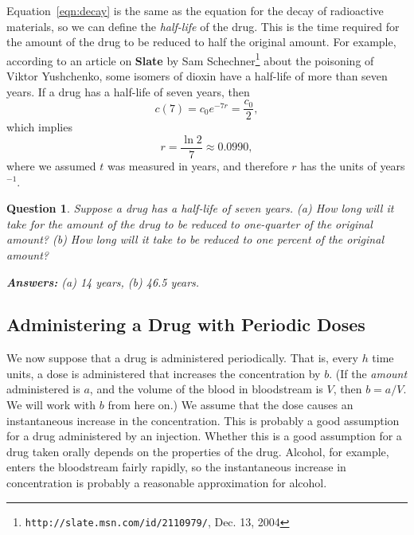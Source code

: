 \documentclass[reqno]{immbook}
\numberwithin{equation}{chapter}
\newtheorem{question}{Question}
\numberwithin{question}{section}
\numberwithin{theorem}{chapter}
\numberwithin{figure}{chapter}
\theoremstyle{definition}
\begin{document}
Equation~\eqref{eqn:decay}
is the same as the equation for the decay of
radioactive materials, so we can define the
\emph{half-life} of the drug. This is the time
required for the amount of the drug to be reduced
to half the original amount.
For example, according to an article on
\textbf{Slate} by Sam Schechner\footnote{\texttt{http://slate.msn.com/id/2110979/}, Dec. 13, 2004}
about the poisoning of Viktor Yushchenko, some isomers of 
dioxin have a half-life of more than seven years.
If a drug has a half-life of seven years, then
\begin{equation}
   c(7) = c_0e^{-7r} = \frac{c_0}{2},
\end{equation}
which implies
\begin{equation}
   r = \frac{\ln 2}{7} \approx 0.0990,
\end{equation}
where we assumed $t$ was measured in years, and therefore
$r$ has the units of years$^{-1}$.
\begin{question}
Suppose a drug has a half-life of seven years.
(a) How long will it take for the amount of the drug to
be reduced to one-quarter of the original amount?
(b) How long will it take to be reduced to one percent of the 
original amount?

\hfill \textbf{Answers:} (a) 14 years, (b) 46.5 years.
\end{question}

\subsection*{Administering a Drug with Periodic Doses}
We now suppose that a drug is administered periodically.
That is, every $h$ time units, a dose is administered that
increases the concentration by $b$.
(If the \emph{amount} administered is $a$, and the volume
of the blood in bloodstream is $V$, then $b=a/V$.
We will work with $b$ from here on.)
We assume that the dose causes an instantaneous increase
in the concentration.  This is probably a
good assumption for a drug administered by an injection.
Whether this is a good assumption for a drug taken
orally depends on the properties of the drug.
Alcohol, for example, enters the bloodstream fairly
rapidly, so the instantaneous increase in concentration
is probably a reasonable approximation for alcohol.
\end{document}
